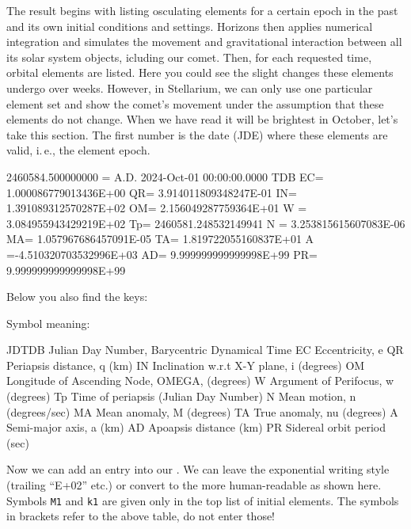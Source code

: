 \noindent The result begins with listing osculating elements for a certain epoch in the past and its own initial conditions and settings. 
Horizons then applies numerical integration and simulates the movement and gravitational interaction between all its solar system objects, icluding our comet. 
Then, for each requested time, orbital elements are listed. Here you could see the slight changes these elements undergo over weeks. 
However, in Stellarium, we can only use one particular element set and show the comet's movement under the assumption that these elements do not change. 
When we have read it will be brightest in October, let's take this section. The first number is the date (JDE) where these elements are valid, 
i.\,e., the element epoch.

\begin{configfile}[\scriptsize]
2460584.500000000 = A.D. 2024-Oct-01 00:00:00.0000 TDB 
 EC= 1.000086779013436E+00 QR= 3.914011809348247E-01 IN= 1.391089312570287E+02
 OM= 2.156049287759364E+01 W = 3.084955943429219E+02 Tp=  2460581.248532149941
 N = 3.253815615607083E-06 MA= 1.057967686457091E-05 TA= 1.819722055160837E+01
 A =-4.510320703532996E+03 AD= 9.999999999999998E+99 PR= 9.999999999999998E+99
\end{configfile}
Below you also find the keys:

\begin{configfile}
   Symbol meaning:

    JDTDB    Julian Day Number, Barycentric Dynamical Time
      EC     Eccentricity, e
      QR     Periapsis distance, q (km)
      IN     Inclination w.r.t X-Y plane, i (degrees)
      OM     Longitude of Ascending Node, OMEGA, (degrees)
      W      Argument of Perifocus, w (degrees)
      Tp     Time of periapsis (Julian Day Number)
      N      Mean motion, n (degrees/sec)
      MA     Mean anomaly, M (degrees)
      TA     True anomaly, nu (degrees)
      A      Semi-major axis, a (km)
      AD     Apoapsis distance (km)
      PR     Sidereal orbit period (sec)
\end{configfile} 
 
\noindent Now we can add an entry into our . 
We can leave the exponential writing style (trailing ``E+02'' etc.) 
or convert to the more human-readable as shown here. 
Symbols \texttt{M1} and \texttt{k1} are given only in the top list of initial elements. 
The symbols in brackets refer to the above table, do not enter those!

